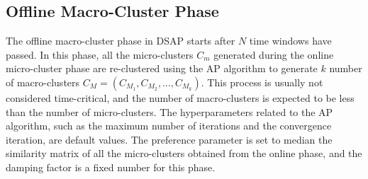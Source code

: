 









\subsection{Offline Macro-Cluster Phase}

The offline macro-cluster phase in DSAP starts after $N$ time windows have passed. In this phase, all the micro-clusters $C_m$ generated during the online micro-cluster phase are re-clustered using the AP algorithm to generate $k$ number of macro-clusters $C_M = (C_{M_1}, C_{M_2}, ..., C_{M_k})$. This process is usually not considered time-critical, and the number of macro-clusters is expected to be less than the number of micro-clusters. The hyperparameters related to the AP algorithm, such as the maximum number of iterations and the convergence iteration, are default values. The preference parameter is set to median the similarity matrix of all the micro-clusters obtained from the online phase, and the damping factor is a fixed number for this phase.



